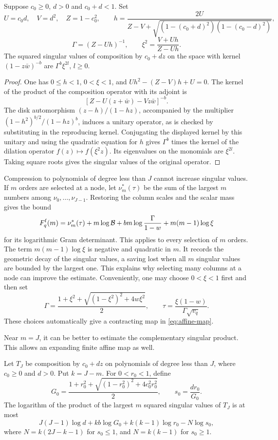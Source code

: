 \begin{lemma}\label{lem:composition}
Suppose $c_0\geq0$, $d>0$ and $c_0+d<1$. Set
\[
 U=c_0d,\quad V=d^2,\quad Z=1-c_0^2,\qquad
 h=\frac{2U}{Z-V+\sqrt{(1-(c_0+d)^2)(1-(c_0-d)^2)}},
\]
\[
 \Gamma=(Z-Uh)^{-1},\qquad \xi^2=\frac{V+Uh}{Z-Uh}.
\]
The squared singular values of composition by $c_0+dz$ on the space with kernel $(1-z\bar w)^{-b}$ are $\Gamma^b\xi^{2l}$, $l\geq0$.
\end{lemma}
\begin{proof}
One has $0\leq h<1$, $0<\xi<1$, and
$Uh^2-(Z-V)h+U=0$. The kernel of the product of the composition operator with its adjoint is
\[
 [Z-U(z+\bar w)-Vz\bar w]^{-b}.
\]
The disk automorphism $(z-h)/(1-hz)$, accompanied by the multiplier
$(1-h^2)^{b/2}/(1-hz)^b$, induces a unitary operator, as is checked by substituting in the reproducing kernel. Conjugating the displayed kernel by this unitary and using the quadratic equation for $h$ gives $\Gamma^b$ times the kernel of the dilation operator $f(z)\mapsto f(\xi^2z)$. Its eigenvalues on the monomials are $\xi^{2l}$. Taking square roots gives the singular values of the original operator.
\end{proof}

Compression to polynomials of degree less than $J$ cannot increase singular values. If $m$ orders are selected at a node, let $\nu_m^*(\tau)$ be the sum of the largest $m$ numbers among $\nu_0,\ldots,\nu_{J-1}$. Restoring the column scales and the scalar mass gives the bound
\begin{equation}\label{eq:forward-cost}
 F_q^{\rm f}(m)=\nu_m^*(\tau)
   +m\log\mathcal B+bm\log\frac\Gamma{1-w}
   +m(m-1)\log\xi
\end{equation}
for its logarithmic Gram determinant. This applies to every selection of $m$ orders.
The term $m(m-1)\log\xi$ is negative and quadratic in $m$. It records the
geometric decay of the singular values, a saving lost when all $m$ singular
values are bounded by the largest one. This explains why selecting many
columns at a node can improve the estimate.
Conveniently, one may choose $0<\xi<1$ first and then set
\[
 \Gamma=\frac{1+\xi^2+\sqrt{(1-\xi^2)^2+4w\xi^2}}2,\qquad
 \tau=\frac{\xi(1-w)}{\Gamma\sqrt{v_q}}.
\]
These choices automatically give a contracting map in \eqref{eq:affine-map}.

Near $m=J$, it can be better to estimate the complementary singular product. This allows an expanding finite affine map as well.
\begin{lemma}\label{lem:complementary}
Let $T_J$ be composition by $c_0+dz$ on polynomials of degree less than $J$, where $c_0\geq0$ and $d>0$. Put $k=J-m$. For $0<r_0<1$, define
\[
 G_0=\frac{1+r_0^2+\sqrt{(1-r_0^2)^2+4c_0^2r_0^2}}2,\qquad
 s_0=\frac{dr_0}{G_0}.
\]
The logarithm of the product of the largest $m$ squared singular values of $T_J$ is at most
\begin{equation}\label{eq:complementary-cost}
 J(J-1)\log d+kb\log G_0+k(k-1)\log r_0-N\log s_0,
\end{equation}
where $N=k(2J-k-1)$ for $s_0\leq1$, and $N=k(k-1)$ for $s_0\geq1$.
\end{lemma}



